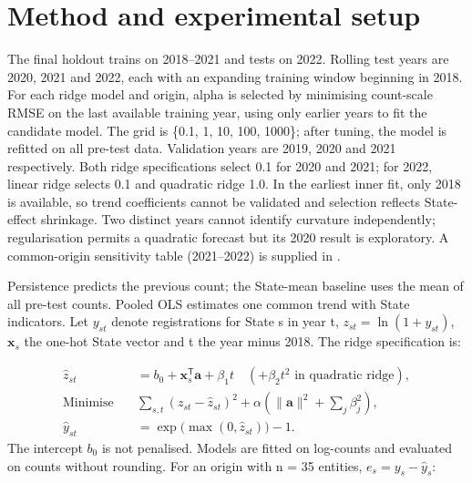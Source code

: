 \documentclass[runningheads]{llncs}
\begin{document}
\section{Method and experimental setup}
The final holdout trains on 2018--2021 and tests on 2022. Rolling test years are 2020, 2021 and 2022, each with an expanding training window beginning in 2018. For each ridge model and origin, alpha is selected by minimising count-scale RMSE on the last available training year, using only earlier years to fit the candidate model. The grid is \{0.1, 1, 10, 100, 1000\}; after tuning, the model is refitted on all pre-test data. Validation years are 2019, 2020 and 2021 respectively. Both ridge specifications select 0.1 for 2020 and 2021; for 2022, linear ridge selects 0.1 and quadratic ridge 1.0. In the earliest inner fit, only 2018 is available, so trend coefficients cannot be validated and selection reflects State-effect shrinkage. Two distinct years cannot identify curvature independently; regularisation permits a quadratic forecast but its 2020 result is exploratory. A common-origin sensitivity table (2021--2022) is supplied in .

Persistence predicts the previous count; the State-mean baseline uses the mean of all pre-test counts. Pooled OLS estimates one common trend with State indicators. Let $y_{st}$ denote registrations for State s in year t, $z_{st}=\ln(1+y_{st})$, $\mathbf{x}_s$ the one-hot State vector and t the year minus 2018. The ridge specification \cite{ref19} is:

\begin{align*}
\hat z_{st} &= b_0+\mathbf{x}_s^{\mathsf T}\mathbf a+\beta_1t
  \quad (+\beta_2t^2\text{ in quadratic ridge}),\\
\text{Minimise}\quad &\sum_{s,t}(z_{st}-\hat z_{st})^2
 +\alpha\left(\lVert\mathbf a\rVert^2+\sum_j\beta_j^2\right),\\
\hat y_{st} &= \exp\bigl(\max(0,\hat z_{st})\bigr)-1.
\end{align*}
The intercept $b_0$ is not penalised. Models are fitted on log-counts and evaluated on counts without rounding. For an origin with n = 35 entities, $e_s=y_s-\hat y_s$:
\end{document}
